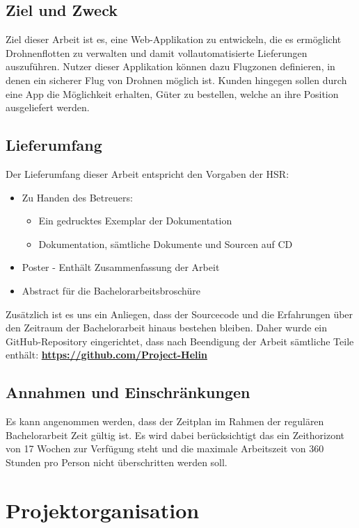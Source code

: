 \subsection{Ziel und Zweck}
Ziel dieser Arbeit ist es, eine Web-Applikation zu entwickeln, die es ermöglicht Drohnenflotten zu verwalten und damit vollautomatisierte Lieferungen auszuführen. Nutzer dieser Applikation können dazu Flugzonen definieren, in denen ein sicherer Flug von Drohnen möglich ist. Kunden hingegen sollen durch eine App die Möglichkeit erhalten, Güter zu bestellen, welche an ihre Position ausgeliefert werden.

\subsection{Lieferumfang}
Der Lieferumfang dieser Arbeit entspricht den Vorgaben der HSR:
\begin{itemize}
	\item{Zu Handen des Betreuers:
	\begin{itemize}
		\item{Ein gedrucktes Exemplar der Dokumentation}
		\item{Dokumentation, sämtliche Dokumente und Sourcen auf CD}
	\end{itemize}}
	\item{Poster - Enthält Zusammenfassung der Arbeit}
	\item{Abstract für die Bachelorarbeitsbroschüre}
\end{itemize}
Zusätzlich ist es uns ein Anliegen, dass der Sourcecode und die Erfahrungen über den Zeitraum der Bachelorarbeit hinaus bestehen bleiben. Daher wurde ein GitHub-Repository eingerichtet, dass nach Beendigung der Arbeit sämtliche Teile enthält: \textbf{\url{https://github.com/Project-Helin}}

\subsection{Annahmen und Einschränkungen}
Es kann angenommen werden, dass der Zeitplan im Rahmen der regulären Bachelorarbeit Zeit gültig ist. Es wird dabei berücksichtigt das ein Zeithorizont von 17 Wochen zur Verfügung steht und die maximale Arbeitszeit von 360 Stunden pro Person nicht überschritten werden soll.
\section{Projektorganisation}
